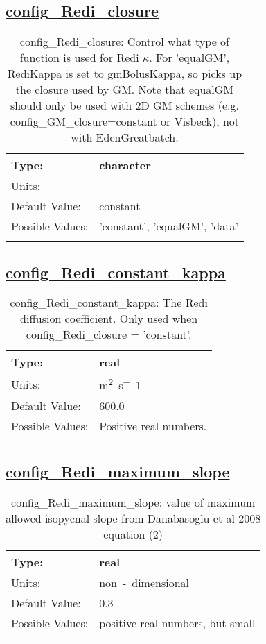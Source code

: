 \subsection[config\_Redi\_closure]{\hyperref[sec:nm_tab_Redi_isopycnal_mixing]{config\_Redi\_closure}}
\label{subsec:nm_sec_config_Redi_closure}
\begin{center}
\begin{longtable}{| p{2.0in} || p{4.0in} |}
    \hline
    Type: & character \\
    \hline
    Units: & -- \\
    \hline
    Default Value: & constant \\
    \hline
    Possible Values: & 'constant', 'equalGM', 'data' \\
    \hline
    \caption{config\_Redi\_closure: Control what type of function is used for Redi $\kappa$. For 'equalGM', RediKappa is set to gmBolusKappa, so picks up the closure used by GM. Note that equalGM should only be used with 2D GM schemes (e.g. config\_GM\_closure=constant or Visbeck), not with EdenGreatbatch.}
\end{longtable}
\end{center}
\subsection[config\_Redi\_constant\_kappa]{\hyperref[sec:nm_tab_Redi_isopycnal_mixing]{config\_Redi\_constant\_kappa}}
\label{subsec:nm_sec_config_Redi_constant_kappa}
\begin{center}
\begin{longtable}{| p{2.0in} || p{4.0in} |}
    \hline
    Type: & real \\
    \hline
    Units: & \si{m^2.s^-1} \\
    \hline
    Default Value: & 600.0 \\
    \hline
    Possible Values: & Positive real numbers. \\
    \hline
    \caption{config\_Redi\_constant\_kappa: The Redi diffusion coefficient. Only used when config\_Redi\_closure = 'constant'.}
\end{longtable}
\end{center}
\subsection[config\_Redi\_maximum\_slope]{\hyperref[sec:nm_tab_Redi_isopycnal_mixing]{config\_Redi\_maximum\_slope}}
\label{subsec:nm_sec_config_Redi_maximum_slope}
\begin{center}
\begin{longtable}{| p{2.0in} || p{4.0in} |}
    \hline
    Type: & real \\
    \hline
    Units: & \si{non-dimensional} \\
    \hline
    Default Value: & 0.3 \\
    \hline
    Possible Values: & positive real numbers, but small \\
    \hline
    \caption{config\_Redi\_maximum\_slope: value of maximum allowed isopycnal slope from Danabasoglu et al 2008 equation (2)}
\end{longtable}
\end{center}
